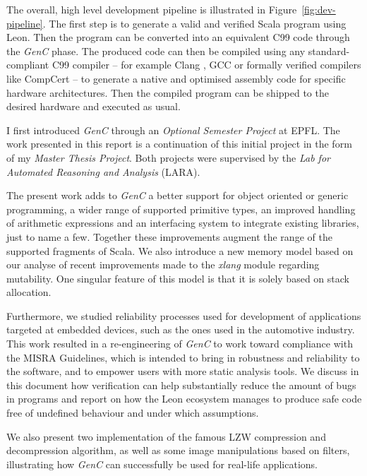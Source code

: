 \documentclass[a4paper,twoside]{article}
\newcommand{\GenC}{\emph{GenC}\xspace}
\newcommand{\RefFig}[1]{Figure~\ref{#1}}
\begin{document}
The overall, high level development pipeline is illustrated in
\RefFig{fig:dev-pipeline}. The first step is to generate a valid and verified
Scala program using Leon. Then the program can be converted into an equivalent
C99 code through the \GenC phase.  The produced code can then be compiled using
any standard-compliant C99 compiler -- for example Clang \cite{clang}, GCC
\cite{gcc} or formally verified compilers like CompCert \cite{Leroy-backend}
\cite{compcert} -- to generate a native and optimised assembly code for specific
hardware architectures. Then the compiled program can be shipped to the desired
hardware and executed as usual.

I first introduced \GenC through an \emph{Optional Semester Project} at EPFL.
The work presented in this report is a continuation of this initial project in
the form of my \emph{Master Thesis Project}. Both projects were supervised by
the \emph{Lab for Automated Reasoning and Analysis} (LARA).

The present work adds to \GenC a better support for object oriented or generic
programming, a wider range of supported primitive types, an improved handling of
arithmetic expressions and an interfacing system to integrate existing
libraries, just to name a few. Together these improvements augment the range of
the supported fragments of Scala. We also introduce a new memory model based on
our analyse of recent improvements made to the \emph{xlang} module
\cite{Blanc:2013:OLV:2489837.2489838} \cite{xlang} regarding mutability. One
singular feature of this model is that it is solely based on stack allocation.

Furthermore, we studied reliability processes used for development of
applications targeted at embedded devices, such as the ones used in the
automotive industry. This work resulted in a re-engineering of \GenC to work
toward compliance with the MISRA Guidelines, which is intended to bring in
robustness and reliability to the software, and to empower users with more
static analysis tools. We discuss in this document how verification can help
substantially reduce the amount of bugs in programs and report on how the Leon
ecosystem manages to produce safe code free of undefined behaviour and under
which assumptions.

We also present two implementation of the famous LZW \cite{welch1985high}
compression and decompression algorithm, as well as some image manipulations
based on filters, illustrating how \GenC can successfully be used for real-life
applications.
\end{document}

